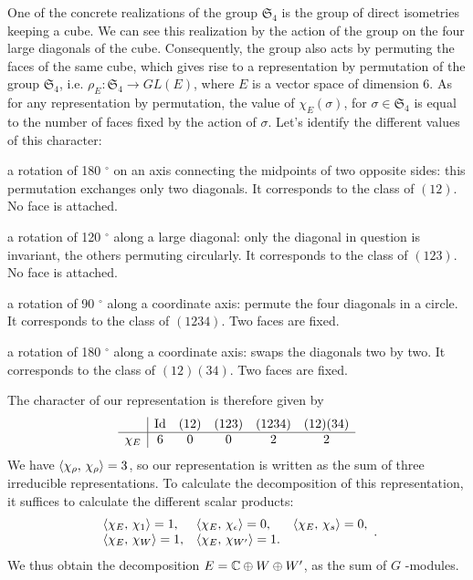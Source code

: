  
 
One of the concrete realizations of the group $ \mathfrak{S}_4 $ is the group of direct isometries keeping a cube. We can see this realization by the action of the group on the four large diagonals of the cube. Consequently, the group also acts by permuting the faces of the same cube, which gives rise to a representation by permutation of the group $ \mathfrak{S}_4 $, i.e. $ \rho_E: \mathfrak{S }_4 \rightarrow GL (E) $, where $ E $ is a vector space of dimension $ 6 $. As for any representation by permutation, the value of $ \chi_E (\sigma) $, for $ \sigma \in \mathfrak{S}_4 $ is equal to the number of faces fixed by the action of $ \sigma $. Let's identify the different values of this character: \begin{rs}
\item {} a rotation of 180 $^\circ $ on an axis connecting the midpoints of two opposite sides: this permutation exchanges only two diagonals. It corresponds to the class of $ (12) $. No face is attached.
\item a rotation of 120 $^\circ $ along a large diagonal: only the diagonal in question is invariant, the others permuting circularly. It corresponds to the class of $ (123) $. No face is attached.
\item a rotation of 90 $^\circ $ along a coordinate axis: permute the four diagonals in a circle. It corresponds to the class of $ (1234) $. Two faces are fixed.
\item a rotation of 180 $^\circ $ along a coordinate axis: swaps the diagonals two by two. It corresponds to the class of $ (12) (34) $. Two faces are fixed.
\end{rs} The character of our representation is therefore given by
\begin{equation*}
\begin{array}{c | ccccc} & \operatorname{Id} & (12) & (123) & (1234) & (12) (34) \\\hline \chi_E & 6 & 0 & 0 & 2 & 2 \end{array}
\end{equation*}
We have $ \langle \chi_{\rho},\,\chi_{\rho}\rangle = 3 $, so our representation is written as the sum of three irreducible representations. To calculate the decomposition of this representation, it suffices to calculate the different scalar products:
\begin{equation*}
\begin{array}{lll} \langle \chi_E,\,\chi_1\rangle = 1, & \langle \chi_E,\,\chi_{\epsilon}\rangle = 0, & \langle \chi_E,\,\chi_s\rangle = 0, \\\langle \chi_E,\,\chi_{W}\rangle = 1, & \langle \chi_E,\,\chi_{W'}\rangle = 1. & \end{array}.
\end{equation*}
We thus obtain the decomposition $ E = \mathbb{C} \oplus W \oplus W'$, as the sum of $ G $ -modules.
